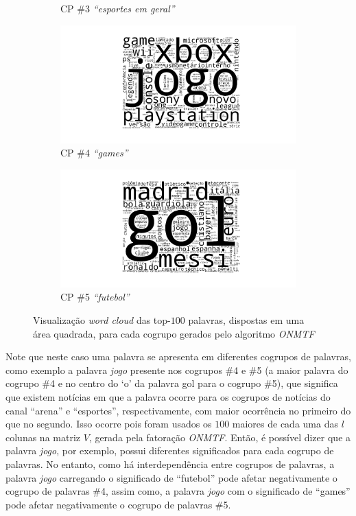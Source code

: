 \documentclass[
    12pt,                %
    oneside,            %
    a4paper,            %
    english,            %
    brazil                %
    ]{abntex2ppgsi}
\begin{document}
\begin{figure}[H]
\begin{subfigure}[b]{0.45\textwidth}
        \caption{CP \#3 \textit{``esportes em geral''}}
    \end{subfigure}
    \begin{subfigure}[b]{0.45\textwidth}
        \includegraphics[width=\textwidth]{img/onmtf-tc-4.png}
        \caption{CP \#4 \textit{``games''}}
    \end{subfigure}
    \begin{subfigure}[b]{0.45\textwidth}
        \includegraphics[width=\textwidth]{img/onmtf-tc-5.png}
        \caption{CP \#5 \textit{``futebol''}}
    \end{subfigure}

    \caption{Visualização \textit{word cloud} das top-$100$ palavras, dispostas em uma área quadrada, para cada cogrupo gerados pelo algoritmo \textit{ONMTF}}
    \label{fig:onmtf:wordcloud}
\end{figure}

Note que neste caso uma palavra se apresenta em diferentes cogrupos de palavras, como exemplo a palavra \textit{jogo} presente nos cogrupos \#4 e \#5 (a maior palavra do cogrupo \#4 e no centro do `o' da palavra gol para o cogrupo \#5), que significa que existem notícias em que a palavra ocorre para os cogrupos de notícias do canal ``arena'' e ``esportes'', respectivamente, com maior ocorrência no primeiro do que no segundo.
Isso ocorre pois foram usados os $100$ maiores de cada uma das $l$ colunas na matriz $V$, gerada pela fatoração \textit{ONMTF}.
Então, é possível dizer que a palavra \textit{jogo}, por exemplo, possui diferentes significados para cada cogrupo de palavras.
No entanto, como há interdependência entre cogrupos de palavras, a palavra \textit{jogo} carregando o significado de ``futebol'' pode afetar negativamente o cogrupo de palavras \#4, assim como, a palavra \textit{jogo} com o significado de ``games'' pode afetar negativamente o cogrupo de palavras \#5.
\end{document}
